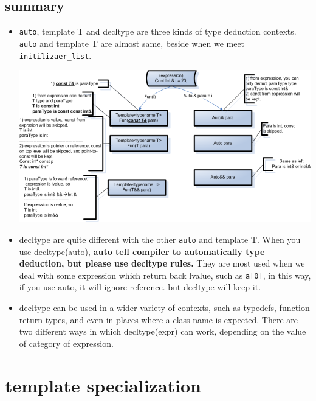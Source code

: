 \documentclass[a4paper,11pt,twoside]{book}
\begin{document}
\subsection{summary}
\begin{itemize}
	\item \texttt{auto}, template T and decltype are three kinds of type deduction contexts. \texttt{auto} and template T are almost same, beside when we meet \texttt{initilizaer\_list}.  

	\begin{center}
		\includegraphics[scale=0.6]{pics/type_deduct.png}
	\end{center}
	
	\item decltype are quite different with the other \texttt{auto} and template T. When you use decltype(auto), \textbf{auto tell compiler to automatically type deduction, but please use decltype rules.} They are most used when we deal with some expression which return back lvalue, such as \texttt{a[0]}, in this way, if you use auto, it will ignore reference. but decltype will keep it. 
	
	\item decltype can be used in a wider variety of contexts, such as typedefs, function return types, and even in places where a class name is expected. There are two different ways in which decltype(expr) can work, depending on the value of category of expression.
	
\end{itemize}

\section{template specialization}
\end{document}
